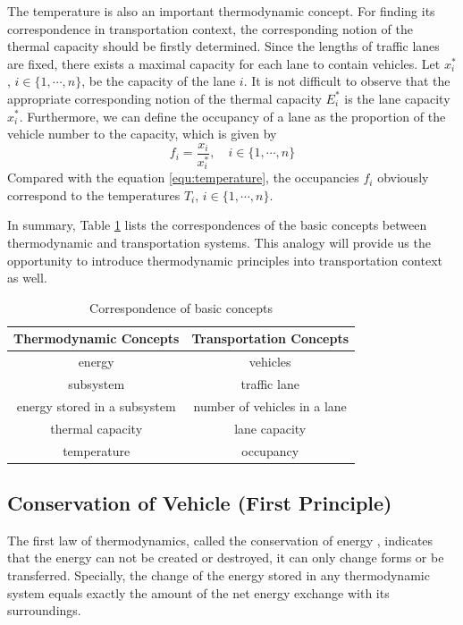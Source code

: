 \documentclass[trsc,nonblindrev]{informs3} %
\begin{document}
The temperature is also an important thermodynamic concept. For
finding its correspondence in transportation context, the
corresponding notion of the thermal capacity should be firstly
determined. Since the lengths of traffic lanes are fixed, there
exists a maximal capacity for each lane to contain vehicles. Let
$x_i^*$, $i\in\{1,\cdots,n\}$, be the capacity of the lane $i$. It is
not difficult to observe that the appropriate corresponding notion of
the thermal capacity $E_i^*$ is the lane capacity $x_i^*$.
Furthermore, we can define the occupancy of a lane as the proportion
of the vehicle number to the capacity, which is given by
\begin{equation}\label{equ:occupancy}
f_i = \frac{x_i}{x_i^*},\quad i\in\{1,\cdots,n\}
\end{equation}
Compared with the equation \eqref{equ:temperature}, the occupancies
$f_i$ obviously correspond to the temperatures $T_i$,
$i\in\{1,\cdots,n\}$.

In summary, Table \ref{tab:notions} lists the correspondences of the
basic concepts between thermodynamic and transportation systems. This
analogy will provide us the opportunity to introduce thermodynamic
principles into transportation context as well.

\begin{table}[ht]
\centering \caption{Correspondence of basic concepts}
\label{tab:notions}
\begin{tabular}{cc}
  \hline
  Thermodynamic Concepts & Transportation Concepts \\
  \hline
  energy & vehicles \\
  subsystem & traffic lane \\
  energy stored in a subsystem & number of vehicles in a lane \\
  thermal capacity & lane capacity \\
  temperature & occupancy \\
  \hline
\end{tabular}
\end{table}

\subsection{Conservation of Vehicle (First Principle)}

The first law of thermodynamics, called the conservation of energy
\citep{cengel_thermodynamics:_2001}, indicates that the energy can
not be created or destroyed, it can only change forms or be
transferred. Specially, the change of the energy stored in any
thermodynamic system equals exactly the amount of the net energy
exchange with its surroundings.
\end{document}
